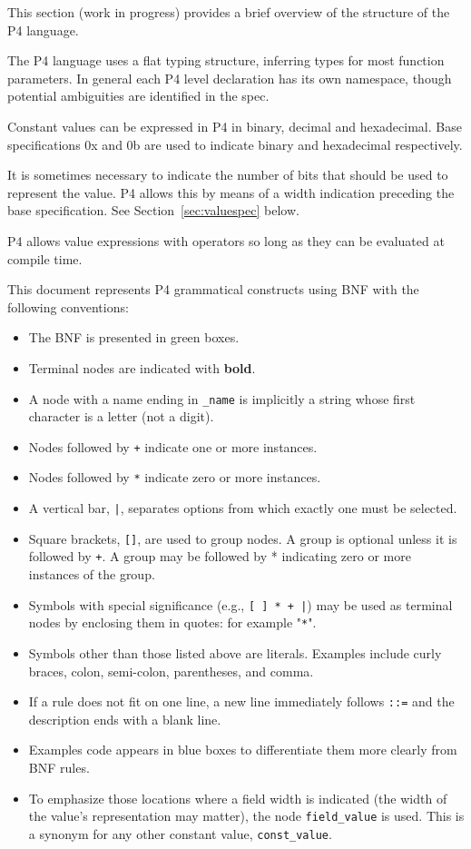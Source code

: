 \documentclass[12pt]{article}
\begin{document}

This section (work in progress) provides a brief overview of the structure 
of the P4 language. 

The P4 language uses a flat typing structure, inferring types for most function 
parameters. In general each P4 level declaration has its own namespace, though 
potential ambiguities are identified in the spec.

Constant values can be expressed in P4 in binary, decimal and hexadecimal.
Base specifications 0x and 0b are used to indicate binary and hexadecimal
respectively. 

It is sometimes necessary to indicate the number of bits that should be used 
to represent the value.  P4 allows this by means of a width indication preceding 
the base specification. See Section~\ref{sec:valuespec} below.

P4 allows value expressions with operators so long as they can be evaluated 
at compile time.


This document represents P4 grammatical constructs using BNF with the
following conventions:

\begin{itemize}
\item
The BNF is presented in green boxes.
\item
Terminal nodes are indicated with \textbf{bold}.
\item
A node with a name ending in \texttt{_name} is implicitly a string whose first character 
is a letter (not a digit).
\item
Nodes followed by \texttt{+} indicate one or more instances.
\item
Nodes followed by \texttt{*} indicate zero or more instances.
\item
A vertical bar, \texttt{|}, separates options from which exactly one must be selected.
\item
Square brackets, \texttt{[]}, are used to group nodes. A group is optional unless 
it is followed by \texttt{+}. A group may be followed by * indicating zero or more 
instances of the group.
\item
Symbols with special significance (e.g., \texttt{[ ] * + |}) may be used as terminal 
nodes by enclosing them in quotes: for example "\texttt{*}".
\item
Symbols other than those listed above are literals. Examples include curly 
braces, colon, semi-colon, parentheses, and comma.
\item
If a rule does not fit on one line, a new line immediately follows \texttt{::=} and 
the description ends with a blank line.
\item
Examples code appears in blue boxes to differentiate them more clearly
from BNF rules.
\item
To emphasize those locations where a field width is indicated (the width of 
the value's representation may matter), the node \texttt{field_value} is used. This 
is a synonym for any other constant value, \texttt{const_value}.
\end{itemize}
\end{document}
